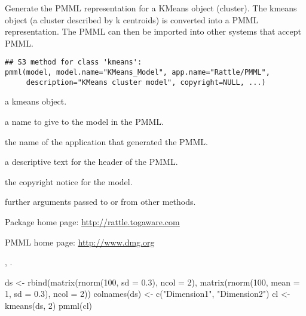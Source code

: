 \begin{Description}\relax
Generate the PMML representation for a KMeans object (cluster). The
kmeans object (a cluster described by k centroids) is converted into a
PMML representation. The PMML can then be imported into other systems
that accept PMML.
\end{Description}
\begin{Usage}
\begin{verbatim}
## S3 method for class 'kmeans':
pmml(model, model.name="KMeans_Model", app.name="Rattle/PMML",
     description="KMeans cluster model", copyright=NULL, ...)
\end{verbatim}
\end{Usage}
\begin{Arguments}
\begin{ldescription}
\item[\code{model}] a kmeans object.
\item[\code{model.name}] a name to give to the model in the PMML.
\item[\code{app.name}] the name of the application that generated the PMML.
\item[\code{description}] a descriptive text for the header of the PMML.
\item[\code{copyright}] the copyright notice for the model.
\item[\code{...}] further arguments passed to or from other methods.
\end{ldescription}
\end{Arguments}
\begin{Author}\relax
{}
\end{Author}
\begin{References}\relax
Package home page: \url{http://rattle.togaware.com}

PMML home page: \url{http://www.dmg.org}
\end{References}
\begin{SeeAlso}\relax
{},
.
\end{SeeAlso}
\begin{Examples}
\begin{ExampleCode}
ds <- rbind(matrix(rnorm(100, sd = 0.3), ncol = 2),
                matrix(rnorm(100, mean = 1, sd = 0.3), ncol = 2))
colnames(ds) <- c("Dimension1", "Dimension2")
cl <- kmeans(ds, 2)
pmml(cl)
\end{ExampleCode}
\end{Examples}

